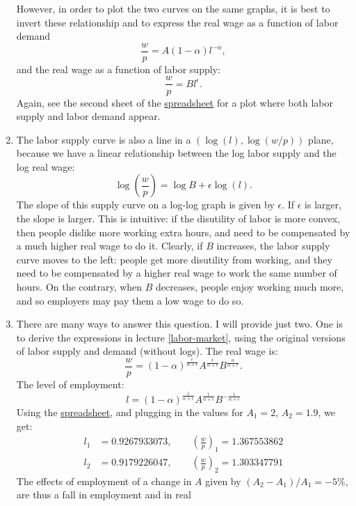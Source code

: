 \documentclass[]{book}
\theoremstyle{definition}
\theoremstyle{definition}
\theoremstyle{definition}
\theoremstyle{remark}
\begin{document}
\begin{enumerate}
  However, in order to plot the two curves on the same graphs, it is
  best to invert these relationship and to express the real wage as a
  function of labor demand \[\frac{w}{p}=A (1-\alpha)l^{-\alpha},\] and
  the real wage as a function of labor supply:
  \[\frac{w}{p}=B l^{\epsilon}.\] Again, see the second sheet of the
  \href{https://docs.google.com/spreadsheets/d/1h9JJD8K2_IE166gdj78waf0zu4YDY9Rp3r5oiJR_06s/edit?usp=sharing}{spreadsheet}
  for a plot where both labor supply and labor demand appear.
\item
  The labor supply curve is also a line in a \((\log(l), \log(w/p))\)
  plane, because we have a linear relationship between the log labor
  supply and the log real wage:
  \[\boxed{\log\left(\frac{w}{p}\right)=\log B + \epsilon \log(l)}.\]
  The slope of this supply curve on a log-log graph is given by
  \(\epsilon\). If \(\epsilon\) is larger, the slope is larger. This is
  intuitive: if the disutility of labor is more convex, then people
  dislike more working extra hours, and need to be compensated by a much
  higher real wage to do it. Clearly, if \(B\) increases, the labor
  supply curve moves to the left: people get more disutility from
  working, and they need to be compensated by a higher real wage to work
  the same number of hours. On the contrary, when \(B\) decreases,
  people enjoy working much more, and so employers may pay them a low
  wage to do so.
\item
  There are many ways to answer this question. I will provide just two.
  One is to derive the expressions in lecture \ref{labor-market}, using
  the original versions of labor supply and demand (without logs). The
  real wage is:
  \[\frac{w}{p} = (1-\alpha)^{\frac{\epsilon}{\alpha+\epsilon}}A^{\frac{\epsilon}{\alpha+\epsilon}} B^{\frac{\alpha}{\alpha+\epsilon}}.\]
  The level of employment:
  \[l= (1-\alpha)^{\frac{1}{\alpha+\epsilon}}A^{\frac{1}{\alpha+\epsilon}} B^{-\frac{1}{\alpha+\epsilon}}\]
  Using the
  \href{https://docs.google.com/spreadsheets/d/1h9JJD8K2_IE166gdj78waf0zu4YDY9Rp3r5oiJR_06s/edit?usp=sharing}{spreadsheet},
  and plugging in the values for \(A_1 = 2\), \(A_2 = 1.9\), we get: \[
  \begin{aligned}
  l_1 &=0.9267933073, \qquad \left(\frac{w}{p}\right)_1=1.367553862\\
  l_2 &=0.9179226047, \qquad \left(\frac{w}{p}\right)_2=1.303347791
  \end{aligned}
  \] The effects of employment of a change in \(A\) given by
  \((A_2-A_1)/A_1=-5\%\), are thus a fall in employment and in real

\end{enumerate}
\end{document}
